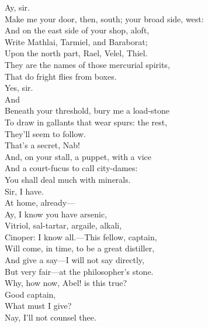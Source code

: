 \documentclass[a4paper,oneside]{memoir}
\begin{document}
\begin{drama*}
\druggerspeaks {} Ay, sir.\\
\subtlespeaks {} Make me your door, then, south; your broad side, west:\\
And on the east side of your shop, aloft,\\
Write Mathlai, Tarmiel, and Baraborat;\\
Upon the north part, Rael, Velel, Thiel.\\
They are the names of those mercurial spirits,\\
That do fright flies from boxes.\\
\druggerspeaks {} Yes, sir.\\
\subtlespeaks {} And\\
Beneath your threshold, bury me a load-stone\\
To draw in gallants that wear spurs: the rest,\\
They'll seem to follow.\\
\facespeaks {} That's a secret, Nab!\\
\subtlespeaks And, on your stall, a puppet, with a vice\\
And a court-fucus to call city-dames:\\
You shall deal much with minerals.\\
\druggerspeaks {} Sir, I have.\\
At home, already---\\
\subtlespeaks {} Ay, I know you have arsenic,\\
Vitriol, sal-tartar, argaile, alkali,\\
Cinoper: I know all.---This fellow, captain,\\
Will come, in time, to be a great distiller,\\
And give a say---I will not say directly,\\
But very fair---at the philosopher's stone.\\
\facespeaks Why, how now, Abel! is this true?\\
\druggerspeaks {}  Good captain,\\
What must I give?\\
\facespeaks {} Nay, I'll not counsel thee.\\

\end{drama*}
\end{document}
